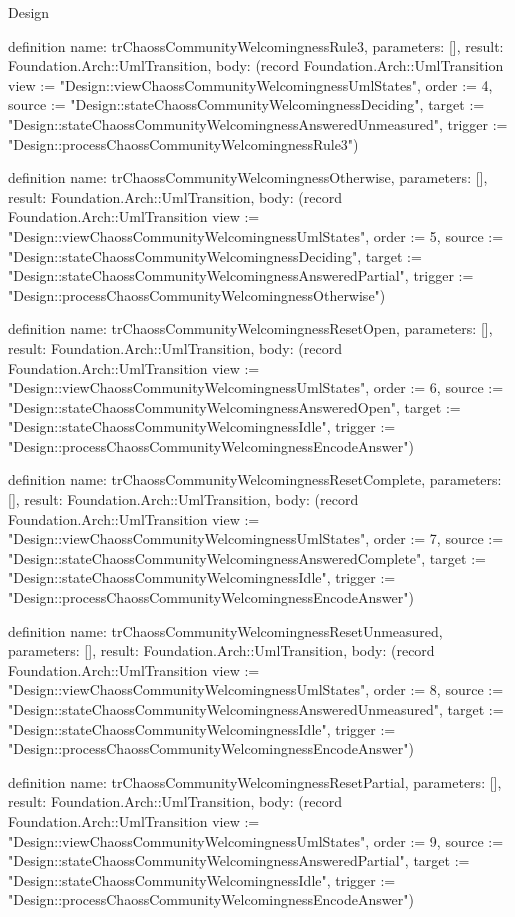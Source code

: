 \begin{lexlean}{Design}
\begin{semanticmodule}
definition{
  name: trChaossCommunityWelcomingnessRule3,
  parameters: [],
  result: Foundation.Arch::UmlTransition,
  body: (record Foundation.Arch::UmlTransition {view := "Design::viewChaossCommunityWelcomingnessUmlStates", order := 4, source := "Design::stateChaossCommunityWelcomingnessDeciding", target := "Design::stateChaossCommunityWelcomingnessAnsweredUnmeasured", trigger := "Design::processChaossCommunityWelcomingnessRule3"})
}

definition{
  name: trChaossCommunityWelcomingnessOtherwise,
  parameters: [],
  result: Foundation.Arch::UmlTransition,
  body: (record Foundation.Arch::UmlTransition {view := "Design::viewChaossCommunityWelcomingnessUmlStates", order := 5, source := "Design::stateChaossCommunityWelcomingnessDeciding", target := "Design::stateChaossCommunityWelcomingnessAnsweredPartial", trigger := "Design::processChaossCommunityWelcomingnessOtherwise"})
}

definition{
  name: trChaossCommunityWelcomingnessResetOpen,
  parameters: [],
  result: Foundation.Arch::UmlTransition,
  body: (record Foundation.Arch::UmlTransition {view := "Design::viewChaossCommunityWelcomingnessUmlStates", order := 6, source := "Design::stateChaossCommunityWelcomingnessAnsweredOpen", target := "Design::stateChaossCommunityWelcomingnessIdle", trigger := "Design::processChaossCommunityWelcomingnessEncodeAnswer"})
}

definition{
  name: trChaossCommunityWelcomingnessResetComplete,
  parameters: [],
  result: Foundation.Arch::UmlTransition,
  body: (record Foundation.Arch::UmlTransition {view := "Design::viewChaossCommunityWelcomingnessUmlStates", order := 7, source := "Design::stateChaossCommunityWelcomingnessAnsweredComplete", target := "Design::stateChaossCommunityWelcomingnessIdle", trigger := "Design::processChaossCommunityWelcomingnessEncodeAnswer"})
}

definition{
  name: trChaossCommunityWelcomingnessResetUnmeasured,
  parameters: [],
  result: Foundation.Arch::UmlTransition,
  body: (record Foundation.Arch::UmlTransition {view := "Design::viewChaossCommunityWelcomingnessUmlStates", order := 8, source := "Design::stateChaossCommunityWelcomingnessAnsweredUnmeasured", target := "Design::stateChaossCommunityWelcomingnessIdle", trigger := "Design::processChaossCommunityWelcomingnessEncodeAnswer"})
}

definition{
  name: trChaossCommunityWelcomingnessResetPartial,
  parameters: [],
  result: Foundation.Arch::UmlTransition,
  body: (record Foundation.Arch::UmlTransition {view := "Design::viewChaossCommunityWelcomingnessUmlStates", order := 9, source := "Design::stateChaossCommunityWelcomingnessAnsweredPartial", target := "Design::stateChaossCommunityWelcomingnessIdle", trigger := "Design::processChaossCommunityWelcomingnessEncodeAnswer"})
}


\end{semanticmodule}
\end{lexlean}
